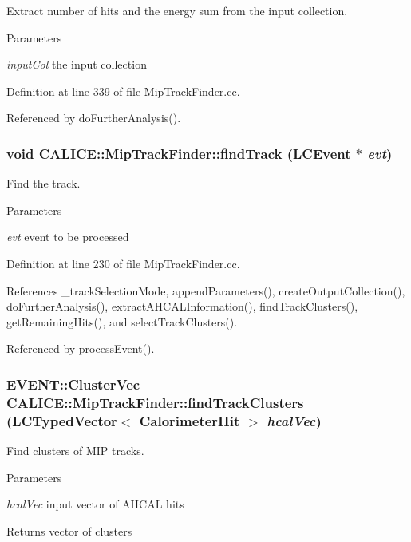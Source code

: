 Extract number of hits and the energy sum from the input collection. 
\begin{DoxyParams}{Parameters}
\item[{\em inputCol}]the input collection \end{DoxyParams}


Definition at line 339 of file MipTrackFinder.cc.

Referenced by doFurtherAnalysis().
\subsubsection[{findTrack}]{\setlength{\rightskip}{0pt plus 5cm}void CALICE::MipTrackFinder::findTrack (LCEvent $\ast$ {\em evt})\hspace{0.3cm}{\ttfamily  [private]}}\label{classCALICE_1_1MipTrackFinder_ab02037fc2a5b5bc03cc9c0a009705cf0}


Find the track. 
\begin{DoxyParams}{Parameters}
\item[{\em evt}]event to be processed \end{DoxyParams}


Definition at line 230 of file MipTrackFinder.cc.

References \_\-trackSelectionMode, appendParameters(), createOutputCollection(), doFurtherAnalysis(), extractAHCALInformation(), findTrackClusters(), getRemainingHits(), and selectTrackClusters().

Referenced by processEvent().
\subsubsection[{findTrackClusters}]{\setlength{\rightskip}{0pt plus 5cm}EVENT::ClusterVec CALICE::MipTrackFinder::findTrackClusters (LCTypedVector$<$ CalorimeterHit $>$ {\em hcalVec})\hspace{0.3cm}{\ttfamily  [private]}}\label{classCALICE_1_1MipTrackFinder_a1015271128036c0a2d801b78562ba97e}


Find clusters of MIP tracks. 
\begin{DoxyParams}{Parameters}
\item[{\em hcalVec}]input vector of AHCAL hits \end{DoxyParams}
\begin{DoxyReturn}{Returns}
vector of clusters 
\end{DoxyReturn}


